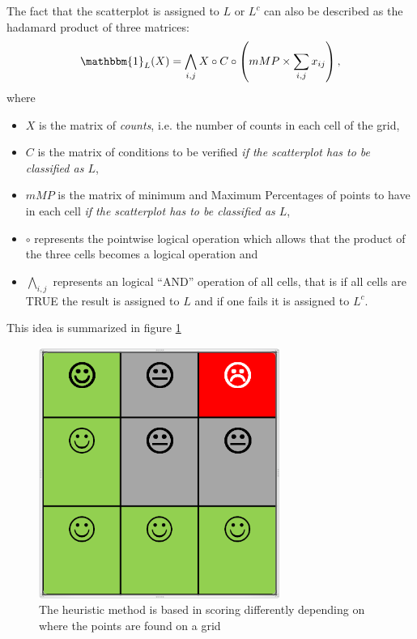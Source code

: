 \documentclass[a4paper,10pt]{article}\usepackage[]{graphicx}\usepackage[]{xcolor}
\begin{document}
The fact that the scatterplot is assigned to $L$ or $L^c$ can also be described as the hadamard product of three matrices:
\begin{equation}
\mathbbm{1}_L(X) = \bigwedge_{i,j} X \circ C \circ \left( mMP \times \sum_{i,j}x_{ij}\right),
\end{equation}
where 
\begin{itemize}
\item ${X}$ is the matrix of \emph{counts}, i.e. the number of counts in each cell of the grid,
\item $C$ is the matrix of conditions to be verified \emph{if the scatterplot has to be classified as $L$},
\item $mMP$ is the matrix of minimum and Maximum Percentages of points to have in each cell \emph{if the scatterplot has to be classified as $L$},
\item $\circ$ represents the pointwise logical operation which allows that the product of the three cells becomes a logical operation and
\item $\bigwedge_{i,j}$ represents an logical ``AND'' operation of all cells, that is if all cells are TRUE the result is assigned to $L$ and if one fails it is assigned to $L^c$.
\end{itemize}

This idea is summarized in figure \ref{Lscore}
\begin{figure}[htbp]
\centering
	\includegraphics[width=0.7\textwidth]{./images/Lscoring.png}
\caption{The heuristic method is based in scoring differently depending on where the points are found on a grid\label{Lscore}}
\end{figure}
\end{document}
